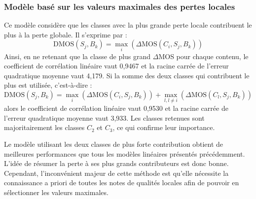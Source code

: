 \subsubsection{Modèle basé sur les valeurs maximales des pertes locales}
Ce modèle considère que les classes avec la plus grande perte locale contribuent le plus à la perte globale. Il s'exprime par :
\begin{equation}
\text{DMOS}(S_j,B_k) = \max_i \left(\Delta\text{MOS}(C_i, S_j, B_k)\right)
\end{equation}
%
Ainsi, en ne retenant que la classe de plus grand $\Delta$MOS pour chaque contenu, le coefficient de corrélation linéaire vaut 0,9467 et la racine carrée de l'erreur quadratique moyenne vaut 4,179. Si la somme des deux classes qui contribuent le plus est utilisée, c'est-à-dire :
\begin{equation}
\text{DMOS}(S_j,B_k) = \max_i \left(\Delta\text{MOS}(C_i, S_j, B_k)\right) + \max_{l, l\neq i} \left(\Delta\text{MOS}(C_l, S_j, B_k)\right)
\end{equation}
%
alors le coefficient de corrélation linéaire vaut 0,9530 et la racine carrée de l'erreur quadratique moyenne vaut 3,933. Les classes retenues sont majoritairement les classes $C_2$ et $C_3$, ce qui confirme leur importance.

Le modèle utilisant les deux classes de plus forte contribution obtient de meilleures performances que tous les modèles linéaires présentés précédemment. L'idée de résumer la perte à ses plus grands contributeurs est donc bonne. Cependant, l'inconvénient majeur de cette méthode est qu'elle nécessite la connaissance a priori de toutes les notes de qualités locales afin de pouvoir en sélectionner les valeurs maximales.


